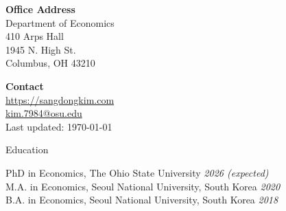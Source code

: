 \documentclass{cv} %
\begin{document}
\begin{minipage}{0.49\textwidth}
	\begin{flushleft}
		\textbf{Office Address} \\
		Department of Economics \\
		410 Arps Hall \\
		1945 N. High St.  \\
		Columbus, OH 43210
	\end{flushleft}
\end{minipage}
\begin{minipage}{0.49\textwidth}
	\begin{flushright}
		\textbf{Contact} \\
		\href{https://sangdongkim.com}{https://sangdongkim.com}\\
		\href{mailto:kim.7984@osu.edu}{kim.7984@osu.edu} \\
		Last updated: \today
		\\
	\end{flushright}
\end{minipage}
\bigskip

\begin{rSection}{Education}

{PhD in Economics, The Ohio State University} \hfill {\em 2026 (expected)} \\
{M.A. in Economics, Seoul National University, South Korea} \hfill {\em 2020} \\
{B.A. in Economics, Seoul National University, South Korea} \hfill {\em 2018}
\end{rSection}
\bigskip
\end{document}
